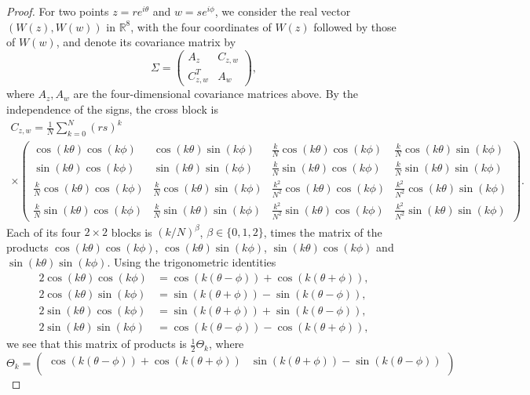 \begin{proof}
For two points $z=re^{i\theta}$ and $w=se^{i\phi}$, we consider the
real vector $(W(z),W(w))$ in $\mathbb R^8$, with the four coordinates of
$W(z)$ followed by those of $W(w)$, and denote its covariance matrix by
\[
 \Sigma=\begin{pmatrix}A_z&C_{z,w}\\ C_{z,w}^T&A_w\end{pmatrix},
\]
where $A_z,A_w$ are the four-dimensional covariance matrices above.
By the independence of the signs, the cross block is
\begingroup
\setlength{\arraycolsep}{1.5pt}
\setlength{\multlinegap}{0pt}
\begin{multline*}
 C_{z,w}=\frac1N\sum_{k=0}^N(rs)^k\\
 \times\begin{pmatrix}
 \cos(k\theta)\cos(k\phi)&\cos(k\theta)\sin(k\phi)&
 \frac kN\cos(k\theta)\cos(k\phi)&\frac kN\cos(k\theta)\sin(k\phi)\\
 \sin(k\theta)\cos(k\phi)&\sin(k\theta)\sin(k\phi)&
 \frac kN\sin(k\theta)\cos(k\phi)&\frac kN\sin(k\theta)\sin(k\phi)\\
 \frac kN\cos(k\theta)\cos(k\phi)&\frac kN\cos(k\theta)\sin(k\phi)&
 \frac{k^2}{N^2}\cos(k\theta)\cos(k\phi)&\frac{k^2}{N^2}\cos(k\theta)\sin(k\phi)\\
 \frac kN\sin(k\theta)\cos(k\phi)&\frac kN\sin(k\theta)\sin(k\phi)&
 \frac{k^2}{N^2}\sin(k\theta)\cos(k\phi)&\frac{k^2}{N^2}\sin(k\theta)\sin(k\phi)
 \end{pmatrix}.
\end{multline*}
\endgroup
Each of its four $2\times2$ blocks is $(k/N)^\beta$, $\beta\in\{0,1,2\}$,
times the matrix of the products $\cos(k\theta)\cos(k\phi)$,
$\cos(k\theta)\sin(k\phi)$, $\sin(k\theta)\cos(k\phi)$ and
$\sin(k\theta)\sin(k\phi)$.
Using the trigonometric identities
\begin{align*}
 2\cos(k\theta)\cos(k\phi)&=\cos(k(\theta-\phi))+\cos(k(\theta+\phi)),\\
 2\cos(k\theta)\sin(k\phi)&=\sin(k(\theta+\phi))-\sin(k(\theta-\phi)),\\
 2\sin(k\theta)\cos(k\phi)&=\sin(k(\theta+\phi))+\sin(k(\theta-\phi)),\\
 2\sin(k\theta)\sin(k\phi)&=\cos(k(\theta-\phi))-\cos(k(\theta+\phi)),
\end{align*}
we see that this matrix of products is $\tfrac12\Theta_k$, where
\[
 \Theta_k=\begin{pmatrix}
 \cos(k(\theta-\phi))+\cos(k(\theta+\phi))&
 \sin(k(\theta+\phi))-\sin(k(\theta-\phi))\\

\end{pmatrix}\]
\end{proof}
